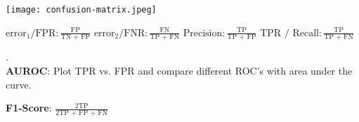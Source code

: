 \begin{multicols*}{2}
	\begin{center}
		\texttt{[image: confusion-matrix.jpeg]}
	\end{center}
	
	$\text{error}_1 / \text{FPR}: \frac{\text{FP}}{\text{TN + FP}}$
	$\text{error}_2 / \text{FNR}: \frac{\text{FN}}{\text{TP + FN}}$
	$\text{Precision}: \frac{\text{TP}}{\text{TP + FP}}$
	$\text{TPR / Recall}: \frac{\text{TP}}{\text{TP + FN}}$
\end{multicols*}

.\\[-20pt]
\textbf{AUROC}: Plot TPR vs. FPR and compare different ROC's with area under the curve.

\textbf{F1-Score}: \quad $\frac{2\text{TP}}{2\text{TP + FP + FN}}$
  
